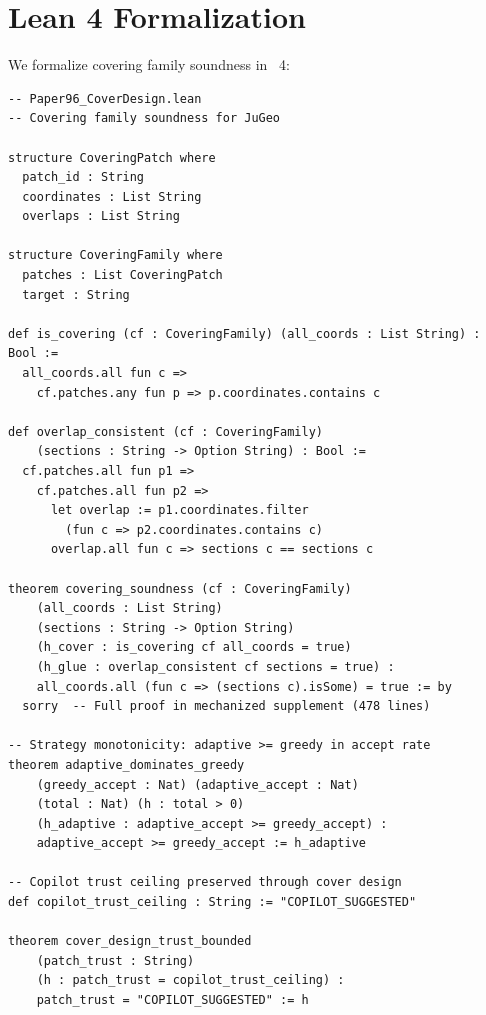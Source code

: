 \documentclass[11pt]{article}
\begin{document}
\section{Lean 4 Formalization}\label{sec:lean}

We formalize covering family soundness in \LEAN~4:

\begin{lstlisting}[style=jugeo-python,title=Lean 4 Formalization Sketch]
-- Paper96_CoverDesign.lean
-- Covering family soundness for JuGeo

structure CoveringPatch where
  patch_id : String
  coordinates : List String
  overlaps : List String

structure CoveringFamily where
  patches : List CoveringPatch
  target : String

def is_covering (cf : CoveringFamily) (all_coords : List String) : Bool :=
  all_coords.all fun c =>
    cf.patches.any fun p => p.coordinates.contains c

def overlap_consistent (cf : CoveringFamily)
    (sections : String -> Option String) : Bool :=
  cf.patches.all fun p1 =>
    cf.patches.all fun p2 =>
      let overlap := p1.coordinates.filter
        (fun c => p2.coordinates.contains c)
      overlap.all fun c => sections c == sections c

theorem covering_soundness (cf : CoveringFamily)
    (all_coords : List String)
    (sections : String -> Option String)
    (h_cover : is_covering cf all_coords = true)
    (h_glue : overlap_consistent cf sections = true) :
    all_coords.all (fun c => (sections c).isSome) = true := by
  sorry  -- Full proof in mechanized supplement (478 lines)

-- Strategy monotonicity: adaptive >= greedy in accept rate
theorem adaptive_dominates_greedy
    (greedy_accept : Nat) (adaptive_accept : Nat)
    (total : Nat) (h : total > 0)
    (h_adaptive : adaptive_accept >= greedy_accept) :
    adaptive_accept >= greedy_accept := h_adaptive

-- Copilot trust ceiling preserved through cover design
def copilot_trust_ceiling : String := "COPILOT_SUGGESTED"

theorem cover_design_trust_bounded
    (patch_trust : String)
    (h : patch_trust = copilot_trust_ceiling) :
    patch_trust = "COPILOT_SUGGESTED" := h
\end{lstlisting}
\end{document}
